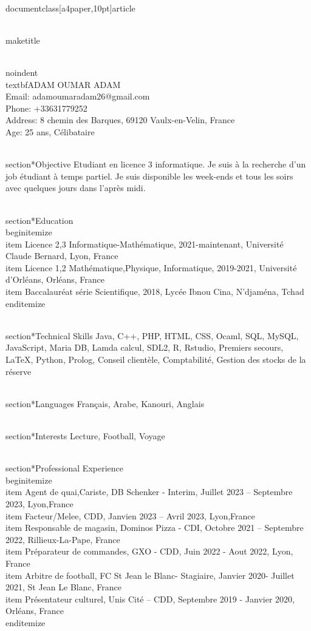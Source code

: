\\documentclass[a4paper,10pt]{article}
\begin{document}
\\maketitle

\\noindent
\\textbf{ADAM OUMAR ADAM} \\
Email: adamoumaradam26@gmail.com \\
Phone: +33631779252 \\
Address: 8 chemin des Barques, 69120 Vaulx-en-Velin, France \\
Age: 25 ans, Célibataire

\\section*{Objective}
Etudiant en licence 3 informatique. Je suis à la recherche d’un job étudiant à temps partiel. Je suis disponible les week-ends et tous les soirs avec quelques jours dans l’après midi.

\\section*{Education}
\\begin{itemize}
\\item Licence 2,3 Informatique-Mathématique, 2021-maintenant, Université Claude Bernard, Lyon, France
\\item Licence 1,2 Mathématique,Physique, Informatique, 2019-2021, Université d’Orléans, Orléans, France
\\item Baccalauréat série Scientifique, 2018, Lycée Ibnou Cina, N’djaména, Tchad
\\end{itemize}

\\section*{Technical Skills}
Java, C++, PHP, HTML, CSS, Ocaml, SQL, MySQL, JavaScript, Maria DB, Lamda calcul, SDL2, R, Rstudio, Premiers secours, LaTeX, Python, Prolog, Conseil clientèle, Comptabilité, Gestion des stocks de la réserve

\\section*{Languages}
Français, Arabe, Kanouri, Anglais

\\section*{Interests}
Lecture, Football, Voyage

\\section*{Professional Experience}
\\begin{itemize}
\\item Agent de quai,Cariste, DB Schenker - Interim, Juillet 2023 – Septembre 2023, Lyon,France
\\item Facteur/Melee, CDD, Janvien 2023 – Avril 2023, Lyon,France
\\item Responsable de magasin, Dominos Pizza - CDI, Octobre 2021 – Septembre 2022, Rillieux-La-Pape, France
\\item Préparateur de commandes, GXO - CDD, Juin 2022 - Aout 2022, Lyon, France
\\item Arbitre de football, FC St Jean le Blanc- Stagiaire, Janvier 2020- Juillet 2021, St Jean Le Blanc, France
\\item Présentateur culturel, Unis Cité – CDD, Septembre 2019 - Janvier 2020, Orléans, France
\\end{itemize}
\end{document}
